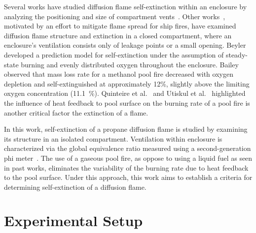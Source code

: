 \documentclass[12pt,letterpaper]{article}
\begin{document}
\begin{flushleft}
Several works have studied diffusion flame self-extinction within an enclosure by analyzing the positioning and size of compartment vents~\cite{chao1991structure,chen2016investigation,chen2013analysis,he2015ventilation,he2013vent,lecoustre2011local,sun2021experimental,utiskul2005compartment,vilfayeau2015numerical,yu2020numerical,yuan2013analysis}. 
Other works~\cite{chow1995studies,nikitin1999self,chow2009numerical,chow2009numerical2,zhang2013self}, motivated by an effort to mitigate flame spread for ship fires, have examined diffusion flame structure and extinction in a closed compartment, where an enclosure's ventilation consists only of leakage points or a small opening. Beyler~\cite{beyler1991analysis} developed a prediction model for self-extinction under the assumption of steady-state burning and evenly distributed oxygen throughout the enclosure. Bailey~\cite{bailey1993methanol} observed that mass loss rate for a methanol pool fire decreased with oxygen depletion and self-extinguished at approximately 12\%, slightly above the limiting oxygen concentration (11.1~\%). Quinteire et al.~\cite{quintiere2004theory} and Utiskul et al.~\cite{utiskul2005compartment} highlighted the influence of heat feedback to pool surface on the burning rate of a pool fire is another critical factor the extinction of a flame.  

In this work, self-extinction of a propane diffusion flame is studied by examining its structure in an isolated compartment. Ventilation within enclosure is characterized via the global equivalence ratio measured using a second-generation phi meter~\cite{Falkenstein2021phimeter,babrauskas1994phi}. The use of a gaseous pool fire, as oppose to using a liquid fuel as seen in past works, eliminates the variability of the burning rate due to heat feedback to the pool surface. Under this approach, this work aims to establish a criteria for determining self-extinction of a diffusion flame.  

\section{Experimental Setup} \addvspace{10pt}

\end{flushleft}
\end{document}

